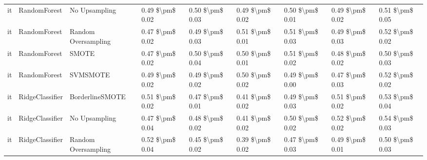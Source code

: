 \begin{tabular}{lllllllll}
      it &                    RandomForest &                 No Upsampling &     0.49 \$\textbackslash pm\$ 0.02 &           0.50 \$\textbackslash pm\$ 0.03 &       0.49 \$\textbackslash pm\$ 0.02 &        0.50 \$\textbackslash pm\$ 0.01 &                         0.49 \$\textbackslash pm\$ 0.02 &     0.51 \$\textbackslash pm\$ 0.05 \\
      it &                    RandomForest &           Random Oversampling &     0.47 \$\textbackslash pm\$ 0.02 &           0.49 \$\textbackslash pm\$ 0.03 &       0.51 \$\textbackslash pm\$ 0.01 &        0.51 \$\textbackslash pm\$ 0.03 &                         0.49 \$\textbackslash pm\$ 0.03 &     0.52 \$\textbackslash pm\$ 0.02 \\
      it &                    RandomForest &                         SMOTE &     0.47 \$\textbackslash pm\$ 0.02 &           0.50 \$\textbackslash pm\$ 0.04 &       0.50 \$\textbackslash pm\$ 0.01 &        0.51 \$\textbackslash pm\$ 0.02 &                         0.48 \$\textbackslash pm\$ 0.02 &     0.50 \$\textbackslash pm\$ 0.03 \\
      it &                    RandomForest &                      SVMSMOTE &     0.49 \$\textbackslash pm\$ 0.02 &           0.49 \$\textbackslash pm\$ 0.02 &       0.50 \$\textbackslash pm\$ 0.02 &        0.49 \$\textbackslash pm\$ 0.00 &                         0.47 \$\textbackslash pm\$ 0.03 &     0.52 \$\textbackslash pm\$ 0.02 \\
      it &                 RidgeClassifier &               BorderlineSMOTE &     0.51 \$\textbackslash pm\$ 0.02 &           0.47 \$\textbackslash pm\$ 0.01 &       0.41 \$\textbackslash pm\$ 0.02 &        0.49 \$\textbackslash pm\$ 0.03 &                         0.51 \$\textbackslash pm\$ 0.02 &     0.53 \$\textbackslash pm\$ 0.04 \\
      it &                 RidgeClassifier &                 No Upsampling &     0.47 \$\textbackslash pm\$ 0.04 &           0.48 \$\textbackslash pm\$ 0.02 &       0.41 \$\textbackslash pm\$ 0.02 &        0.50 \$\textbackslash pm\$ 0.02 &                         0.52 \$\textbackslash pm\$ 0.02 &     0.54 \$\textbackslash pm\$ 0.03 \\
      it &                 RidgeClassifier &           Random Oversampling &     0.52 \$\textbackslash pm\$ 0.04 &           0.45 \$\textbackslash pm\$ 0.02 &       0.39 \$\textbackslash pm\$ 0.02 &        0.47 \$\textbackslash pm\$ 0.03 &                         0.49 \$\textbackslash pm\$ 0.01 &     0.50 \$\textbackslash pm\$ 0.03 \\

\end{tabular}
